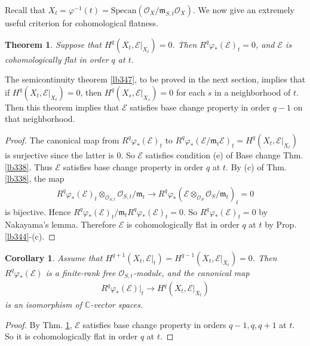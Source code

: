 \documentclass[12pt,b5paper,notitlepage]{report}
\theoremstyle{definition}
\theoremstyle{plain}
\newtheorem{thm}[df]{Theorem}
\newtheorem{co}[df]{Corollary}
\newcommand{\scr}{\mathscr}
\newcommand{\Cbb}{\mathbb C}
\newcommand{\Specan}{\mathrm{Specan}}
\newcommand{\mk}{\mathfrak m}
\numberwithin{equation}{section}
\begin{document}
Recall that $X_t=\varphi^{-1}(t)=\Specan(\scr O_X/\mk_{S,t}\scr O_X)$. We now give an extremely useful criterion for cohomological flatness.

\begin{thm}\label{lb345}
Suppose that $H^q(X_t,\scr E|_{X_t})=0$. Then $R^q\varphi_*(\scr E)_t=0$, and $\scr E$ is cohomologically flat in order $q$ at $t$.
\end{thm}

The semicontinuity theorem \ref{lb347}, to be proved in the next section, implies that if $H^q(X_t,\scr E|_{X_t})=0$, then $H^q(X_s,\scr E|_{X_s})=0$ for each $s$ in a neighborhood of $t$. Then this theorem implies that $\scr E$ satisfies base change property in order $q-1$ on that neighborhood.

\begin{proof}
The canonical map from $R^q\varphi_*(\scr E)_t$ to $R^q\varphi_*(\scr E/\mk_t\scr E)_t=H^q(X_t,\scr E|_{X_t})$ is surjective since the latter is $0$. So $\scr E$ satisfies condition (e) of Base change Thm. \ref{lb338}. Thus $\scr E$ satisfies base change property in order $q$ at $t$. By (c) of Thm. \ref{lb338}, the map
\begin{align*}
R^q\varphi_*(\scr E)_t\otimes_{\scr O_{S,t}}\scr O_{S,t}/\mk_t\rightarrow R^q\varphi_*(\scr E\otimes_{\scr O_S}\scr O_S/\mk_t)_t=0
\end{align*}
is bijective. Hence $R^q\varphi_*(\scr E)_t/\mk_t R^q\varphi_*(\scr E)_t=0$. So $R^q\varphi_*(\scr E)_t=0$ by Nakayama's lemma. Therefore $\scr E$ is cohomologically flat in order $q$ at $t$ by Prop. \ref{lb344}-(c).
\end{proof}

\begin{co}\label{lb359}
Assume that $H^{q+1}(X_t,\scr E|_t)=H^{q-1}(X_t,\scr E|_{X_t})=0$. Then $R^q\varphi_*(\scr E)$ is a finite-rank free $\scr O_{S,t}$-module, and the canonical map
\begin{align*}
R^q\varphi_*(\scr E)|_t\rightarrow H^q(X_t,\scr E|_{X_t})
\end{align*}
is an isomorphism of $\Cbb$-vector spaces.
\end{co}
\begin{proof}
By Thm. \ref{lb345}, $\scr E$ satisfies base change property in orders $q-1,q,q+1$ at $t$. So it is cohomologically flat in order $q$ at $t$.
\end{proof}
\end{document}
